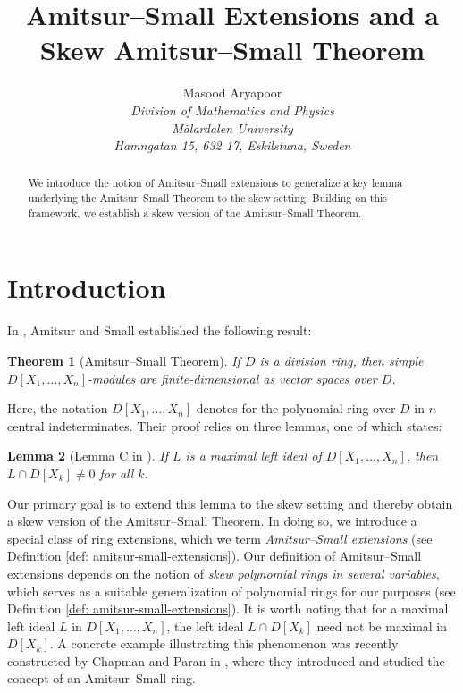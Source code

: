 \documentclass[11pt,a4paper]{article}
\title{Amitsur--Small Extensions and a Skew Amitsur--Small Theorem}
\author{Masood Aryapoor\\
	\tiny{\textit{Division of Mathematics and Physics}}\\
	\tiny{\textit{M\"{a}lardalen  University}}\\
	\tiny{\textit{Hamngatan 15, 632 17, Eskilstuna, 
			Sweden
	}}
}
\date{}
\theoremstyle{theorem}
\newtheorem{theorem}{Theorem}[section]
\newtheorem{lemma}[theorem]{Lemma}
\numberwithin{equation}{section}
\begin{document}
 \maketitle
 
 \begin{abstract}
 	
 	We introduce the notion of Amitsur--Small extensions to generalize a key lemma underlying the Amitsur--Small Theorem to the skew setting. Building on this framework, we establish a skew version of the Amitsur--Small Theorem.
 	
 \end{abstract}
\section{Introduction} 
	 In \cite{AmitsurSmall}, Amitsur and Small established the following result:
	 \begin{theorem}[Amitsur--Small Theorem]\label{thm: Weak Nullstellensatz over division rings}\label{thm: amitsur small}
	 	If $D$ is a division ring, then simple $D[X_1,\dots,X_n]$-modules are finite-dimensional as  vector spaces over $D$.
	 \end{theorem}  
	 Here, the notation $D[X_1,\dots,X_n]$ denotes for the polynomial ring over \(D\) in \(n\) central indeterminates. Their proof relies on three lemmas, one of which states:
	 \begin{lemma}[Lemma C in \cite{AmitsurSmall}]\label{lem: lemmaC}
	 	If \(L\) is a maximal left ideal of \(D[X_1,\dots,X_n]\), then \(L\cap D[X_k]\neq 0 \) for all \(k\). 
	 \end{lemma}
	 Our primary goal is to extend this lemma to the skew setting and thereby obtain a skew version of the Amitsur--Small Theorem. In doing so, we introduce a special class of ring extensions, which we term  \emph{Amitsur--Small extensions}   (see Definition \ref{def: amitsur-small-extensions}). Our definition of  Amitsur--Small extensions depends on the notion of \emph{skew polynomial rings in several variables}, which serves as a suitable generalization of polynomial rings for our purposes (see Definition \ref{def: amitsur-small-extensions}). It is worth noting that for a maximal left ideal \(L\) in  \(D[X_1,\dots,X_n]\), the left ideal \(L\cap D[X_k]\) need not be  maximal in  \(D[X_k]\).   A concrete example illustrating this phenomenon was recently constructed by  Chapman and Paran in \cite{chapman2025amitsur}, where  they introduced and studied the concept of an Amitsur--Small ring.  
	 
\end{document}

